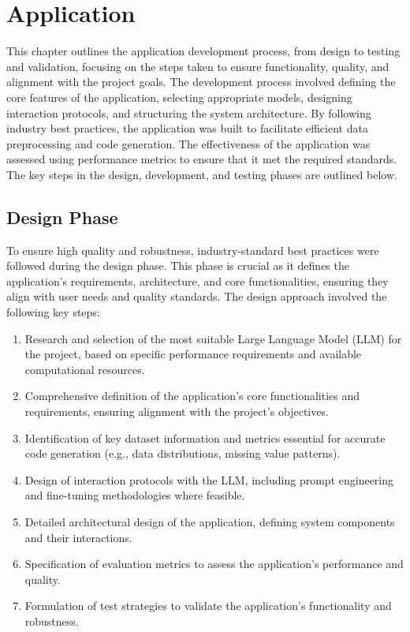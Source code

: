 \chapter{Application}

This chapter outlines the application development process, from design to testing and validation, focusing on the steps taken to ensure functionality, quality, and alignment with the project goals. The development process involved defining the core features of the application, selecting appropriate models, designing interaction protocols, and structuring the system architecture. By following industry best practices, the application was built to facilitate efficient data preprocessing and code generation. The effectiveness of the application was assessed using performance metrics to ensure that it met the required standards. The key steps in the design, development, and testing phases are outlined below.

\section{Design Phase} 
To ensure high quality and robustness, industry-standard best practices were followed during the design phase. This phase is crucial as it defines the application's requirements, architecture, and core functionalities, ensuring they align with user needs and quality standards. The design approach involved the following key steps:

\begin{enumerate} 
    \item Research and selection of the most suitable Large Language Model (LLM) for the project, based on specific performance requirements and available computational resources. 
    \item Comprehensive definition of the application's core functionalities and requirements, ensuring alignment with the project's objectives. 
    \item Identification of key dataset information and metrics essential for accurate code generation (e.g., data distributions, missing value patterns). 
    \item Design of interaction protocols with the LLM, including prompt engineering and fine-tuning methodologies where feasible. 
    \item Detailed architectural design of the application, defining system components and their interactions. 
    \item Specification of evaluation metrics to assess the application's performance and quality. 
    \item Formulation of test strategies to validate the application's functionality and robustness. 
\end{enumerate}

